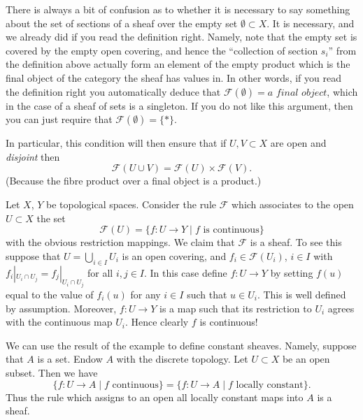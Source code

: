 \begin{remark}
\label{remark-confusion}
There is always a bit of confusion as to whether it is
necessary to say something about the set of sections of
a sheaf over the empty set $\emptyset \subset X$.
It is necessary, and we already did if you read the
definition right. Namely, note that the empty set is
covered by the empty open covering, and hence the ``collection
of section $s_i$'' from the definition above actually form
an element of the empty product which is the final object
of the category the sheaf has values in. In other words,
if you read the definition right you automatically deduce
that $\mathcal{F}(\emptyset) = \textit{a final object}$,
which in the case of a sheaf of sets is a singleton.
If you do not like this argument, then you can just require
that $\mathcal{F}(\emptyset) = \{*\}$.

\medskip\noindent
In particular, this condition will then ensure that if
$U, V \subset X$ are open and {\it disjoint} then
$$
\mathcal{F}(U \cup V) = \mathcal{F}(U) \times \mathcal{F}(V).
$$
(Because the fibre product over a final object is a product.)
\end{remark}

\begin{example}
\label{example-basic-continuous-maps}
Let $X$, $Y$ be topological spaces.
Consider the rule $\mathcal{F}$ which associates to
the open $U \subset X$ the set
$$
\mathcal{F}(U) = \{ f : U \to Y \mid f \text{ is continuous}\}
$$
with the obvious restriction mappings. We claim that
$\mathcal{F}$ is a sheaf. To see this suppose that
$U = \bigcup_{i\in I} U_i$ is an open covering, and
$f_i \in \mathcal{F}(U_i)$, $i\in I$ with
$f_i |_{U_i \cap U_j} = f_j|_{U_i \cap U_j}$ for all $i, j \in I$.
In this case define $f : U \to Y$ by setting $f(u)$
equal to the value of $f_i(u)$ for any $i \in I$ such that
$u \in U_i$. This is well defined by assumption. Moreover,
$f : U \to Y$ is a map such that its restriction to $U_i$
agrees with the continuous map $U_i$. Hence clearly $f$ is
continuous!
\end{example}

\noindent
We can use the result of the example to define constant
sheaves. Namely, suppose that $A$ is a set. Endow $A$ with
the discrete topology. Let $U \subset X$ be an open subset.
Then we have
$$
\{ f : U \to A \mid f\text{ continuous}\}
=
\{ f : U \to A \mid f\text{ locally constant}\}.
$$
Thus the rule which assigns to an open all locally
constant maps into $A$ is a sheaf.

